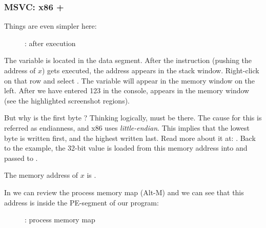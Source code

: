 \clearpage
\subsubsection{MSVC: x86 + \olly}
\myindex{\olly}

Things are even simpler here:

\begin{figure}[H]
\centering
{}
\caption{\olly: after \scanf execution}
\label{fig:scanf_ex2_olly_1}
\end{figure}

The variable is located in the data segment.
After the \PUSH instruction (pushing the address of $x$) gets executed, 
the address appears in the stack window. Right-click on that row and select .
The variable will appear in the memory window on the left.
After we have entered 123 in the console, 
 appears in the memory window (see the highlighted screenshot regions).

But why is the first byte ?
Thinking logically,  must be there.
The cause for this is referred as  \gls{endianness}, and x86 uses \emph{little-endian}.
This implies that the lowest byte is written first, and the highest written last.
Read more about it at: .
Back to the example, the 32-bit value is loaded from this memory address into \EAX and passed to \printf.

The memory address of $x$ is .

\clearpage
In \olly we can review the process memory map (Alt-M)
and we can see that this address is inside the  PE-segment of our program:

\label{olly_memory_map_example}
\begin{figure}[H]
\centering
{}
\caption{\olly: process memory map}
\label{fig:scanf_ex2_olly_2}
\end{figure}

